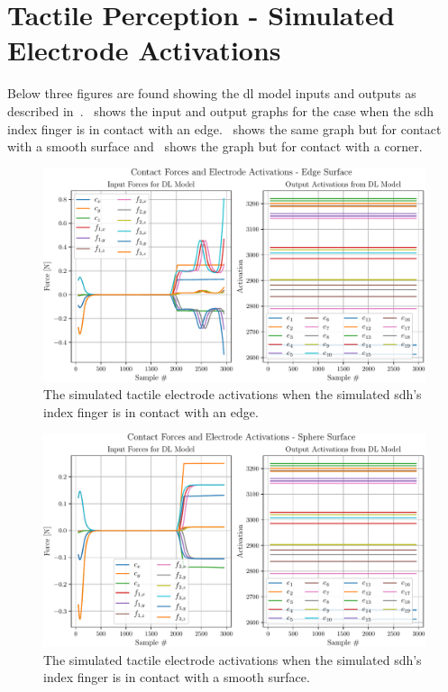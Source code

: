 \chapter{Tactile Perception - Simulated Electrode Activations}\label{app:tactile-perception-simulated-electrode-activations}

Below three figures are found showing the \gls{dl} model inputs and outputs as described in~.~ shows the input and output graphs for the case when the \gls{sdh} index finger is in contact with an edge.~ shows the same graph but for contact with a smooth surface and~ shows the graph but for contact with a corner.

\begin{figure}[!h]
	\begin{center}
		\includegraphics[width=\textwidth]{chapters/1-tactile-perception/fig/matplotlib/edge-contact-graph.pdf}
	\end{center}
	\caption{The simulated tactile electrode activations when the simulated \gls{sdh}'s index finger is in contact with an edge.}
	\label{app:edge-contact-graph}
\end{figure}

\begin{figure}[!h]
	\begin{center}
		\includegraphics[width=\textwidth]{chapters/1-tactile-perception/fig/matplotlib/sphere-contact-graph.pdf}
	\end{center}
	\caption{The simulated tactile electrode activations when the simulated \gls{sdh}'s index finger is in contact with a smooth surface.}
	\label{app:smooth-contact-graph}
\end{figure}

